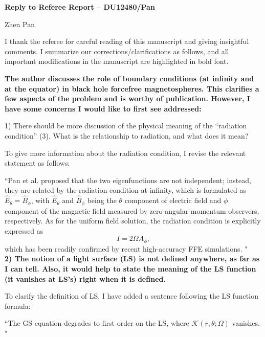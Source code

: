 \documentclass[10pt]{article}
\begin{document}

\begin{center}
{{\large\bf Reply to Referee Report -- DU12480/Pan}}
\end{center}

\begin{center}
{\normalsize Zhen Pan}
\end{center}


I thank the referee for  careful reading of this manuscript and
giving insightful comments. I summarize our corrections/clarifications as follows,
and all important modifications in the manuscript are highlighted in bold font.\\

{\bf The author discusses the role of boundary conditions (at infinity and at the equator) in black hole forcefree
magnetospheres. This clarifies a few aspects of the problem and is worthy of publication.
However, I have some concerns I would like to first see addressed:

1) There should be more discussion of the physical meaning of the “radiation condition” (3). What
is the relationship to radiation, and what does it mean? }

To give more information about the radiation condition, I revise the relevant statement as follows:

``Pan et al.  proposed that the two eigenfunctions are not independent;
instead, they are related by the radiation condition at infinity, which is formulated as
$\hat E_\theta = \hat B_\phi$, with $\hat E_\theta$ and $\hat B_\phi$ being the $\theta$
component of electric field and $\phi$ component of the magnetic field measured
by zero-angular-momentum-observers, respectively.
As for the uniform field solution, the radiation condition is explicitly expressed as
\[ I = 2\Omega A_\phi, \]
which has been readily confirmed by recent high-accuracy FFE simulations. " \\


{\bf 2) The notion of a light surface (LS) is not defined anywhere, as far as I can tell. Also, it would help
to state the meaning of the LS function (it vanishes at LS’s) right when it is defined.}

To clarify the definition of LS, I have added a sentence following the LS function formula:

``The GS equation degrades to first order on the LS, where $\mathcal K(r,\theta; \Omega )$
vanishes. " \\
\end{document}
